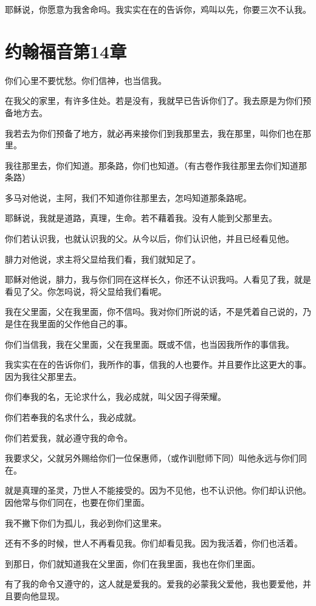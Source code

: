 \documentclass[12pt,oneside]{book}
\begin{document}
耶稣说，你愿意为我舍命吗。我实实在在的告诉你，鸡叫以先，你要三次不认我。

\chapter{约翰福音第14章}
你们心里不要忧愁。你们信神，也当信我。

在我父的家里，有许多住处。若是没有，我就早已告诉你们了。我去原是为你们预备地方去。

我若去为你们预备了地方，就必再来接你们到我那里去，我在那里，叫你们也在那里。

我往那里去，你们知道。那条路，你们也知道。（有古卷作我往那里去你们知道那条路）

多马对他说，主阿，我们不知道你往那里去，怎吗知道那条路呢。

耶稣说，我就是道路，真理，生命。若不藉着我。没有人能到父那里去。

你们若认识我，也就认识我的父。从今以后，你们认识他，并且已经看见他。

腓力对他说，求主将父显给我们看，我们就知足了。

耶稣对他说，腓力，我与你们同在这样长久，你还不认识我吗。人看见了我，就是看见了父。你怎吗说，将父显给我们看呢。

我在父里面，父在我里面，你不信吗。我对你们所说的话，不是凭着自己说的，乃是住在我里面的父作他自己的事。

你们当信我，我在父里面，父在我里面。既或不信，也当因我所作的事信我。

我实实在在的告诉你们，我所作的事，信我的人也要作。并且要作比这更大的事。因为我往父那里去。

你们奉我的名，无论求什么，我必成就，叫父因子得荣耀。

你们若奉我的名求什么，我必成就。

你们若爱我，就必遵守我的命令。

我要求父，父就另外赐给你们一位保惠师，（或作训慰师下同）叫他永远与你们同在。

就是真理的圣灵，乃世人不能接受的。因为不见他，也不认识他。你们却认识他。因他常与你们同在，也要在你们里面。

我不撇下你们为孤儿，我必到你们这里来。

还有不多的时候，世人不再看见我。你们却看见我。因为我活着，你们也活着。

到那日，你们就知道我在父里面，你们在我里面，我也在你们里面。

有了我的命令又遵守的，这人就是爱我的。爱我的必蒙我父爱他，我也要爱他，并且要向他显现。
\end{document}

